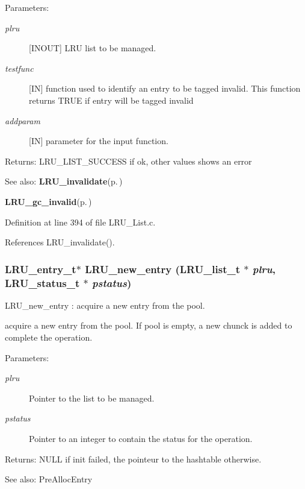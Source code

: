 \begin{Desc}
\item[Parameters:]
\begin{description}
\item[{\em plru}][INOUT] LRU list to be managed. \item[{\em testfunc}][IN] function used to identify an entry to be tagged invalid. This function returns TRUE if entry will be tagged invalid \item[{\em addparam}][IN] parameter for the input function.\end{description}
\end{Desc}
\begin{Desc}
\item[Returns:]LRU\_\-LIST\_\-SUCCESS if ok, other values shows an error\end{Desc}
\begin{Desc}
\item[See also:]{\bf LRU\_\-invalidate}{\rm (p.\,\pageref{group__LRUExportedFunctions_ga1})} 

{\bf LRU\_\-gc\_\-invalid}{\rm (p.\,\pageref{group__LRUExportedFunctions_ga3})} \end{Desc}


Definition at line 394 of file LRU\_\-List.c.

References LRU\_\-invalidate().
\subsubsection{\setlength{\rightskip}{0pt plus 5cm}LRU\_\-entry\_\-t$\ast$ LRU\_\-new\_\-entry (LRU\_\-list\_\-t $\ast$ {\em plru}, LRU\_\-status\_\-t $\ast$ {\em pstatus})}\label{group__LRUExportedFunctions_ga2}


LRU\_\-new\_\-entry : acquire a new entry from the pool.

acquire a new entry from the pool. If pool is empty, a new chunck is added to complete the operation.

\begin{Desc}
\item[Parameters:]
\begin{description}
\item[{\em plru}]Pointer to the list to be managed. \item[{\em pstatus}]Pointer to an integer to contain the status for the operation.\end{description}
\end{Desc}
\begin{Desc}
\item[Returns:]NULL if init failed, the pointeur to the hashtable otherwise.\end{Desc}
\begin{Desc}
\item[See also:]Pre\-Alloc\-Entry \end{Desc}


